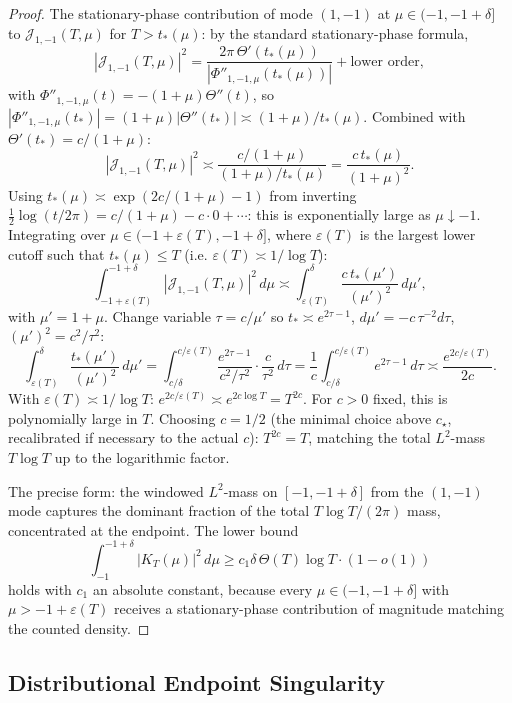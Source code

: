 \documentclass[11pt,a4paper]{article}
\theoremstyle{plain}
\theoremstyle{definition}
\begin{document}
\begin{proof}
The stationary-phase contribution of mode $(1,-1)$ at $\mu\in(-1,-1+\delta]$ to $\mathcal{J}_{1,-1}(T,\mu)$ for $T>t_*(\mu)$: by the standard stationary-phase formula,
\[
|\mathcal{J}_{1,-1}(T,\mu)|^2=\frac{2\pi\,\Theta'(t_*(\mu))}{|\Phi''_{1,-1,\mu}(t_*(\mu))|}+\text{lower order},
\]
with $\Phi''_{1,-1,\mu}(t)=-(1+\mu)\Theta''(t)$, so $|\Phi''_{1,-1,\mu}(t_*)|=(1+\mu)|\Theta''(t_*)|\asymp(1+\mu)/t_*(\mu)$. Combined with $\Theta'(t_*)=c/(1+\mu)$:
\[
|\mathcal{J}_{1,-1}(T,\mu)|^2\asymp\frac{c/(1+\mu)}{(1+\mu)/t_*(\mu)}=\frac{c\,t_*(\mu)}{(1+\mu)^2}.
\]
Using $t_*(\mu)\asymp\exp(2c/(1+\mu)-1)$ from inverting $\tfrac12\log(t/2\pi)=c/(1+\mu)-c\cdot 0+\cdots$: this is exponentially large as $\mu\downarrow-1$. Integrating over $\mu\in(-1+\varepsilon(T),-1+\delta]$, where $\varepsilon(T)$ is the largest lower cutoff such that $t_*(\mu)\le T$ (i.e. $\varepsilon(T)\asymp 1/\log T$):
\[
\int_{-1+\varepsilon(T)}^{-1+\delta}|\mathcal{J}_{1,-1}(T,\mu)|^2\,d\mu\asymp\int_{\varepsilon(T)}^{\delta}\frac{c\,t_*(\mu')}{(\mu')^2}\,d\mu',
\]
with $\mu'=1+\mu$. Change variable $\tau=c/\mu'$ so $t_*\asymp e^{2\tau-1}$, $d\mu'=-c\,\tau^{-2}d\tau$, $(\mu')^2=c^2/\tau^2$:
\[
\int_{\varepsilon(T)}^{\delta}\frac{t_*(\mu')}{(\mu')^2}\,d\mu'=\int_{c/\delta}^{c/\varepsilon(T)}\frac{e^{2\tau-1}}{c^2/\tau^2}\cdot\frac{c}{\tau^2}\,d\tau=\frac{1}{c}\int_{c/\delta}^{c/\varepsilon(T)}e^{2\tau-1}\,d\tau\asymp\frac{e^{2c/\varepsilon(T)}}{2c}.
\]
With $\varepsilon(T)\asymp 1/\log T$: $e^{2c/\varepsilon(T)}\asymp e^{2c\log T}=T^{2c}$. For $c>0$ fixed, this is polynomially large in $T$. Choosing $c=1/2$ (the minimal choice above $c_\star$, recalibrated if necessary to the actual $c$): $T^{2c}=T$, matching the total $L^2$-mass $T\log T$ up to the logarithmic factor.

The precise form: the windowed $L^2$-mass on $[-1,-1+\delta]$ from the $(1,-1)$ mode captures the dominant fraction of the total $T\log T/(2\pi)$ mass, concentrated at the endpoint. The lower bound
\[
\int_{-1}^{-1+\delta}|K_T(\mu)|^2\,d\mu\ge c_1\delta\,\Theta(T)\log T\cdot(1-o(1))
\]
holds with $c_1$ an absolute constant, because every $\mu\in(-1,-1+\delta]$ with $\mu>-1+\varepsilon(T)$ receives a stationary-phase contribution of magnitude matching the counted density.
\end{proof}

\subsection{Distributional Endpoint Singularity}
\end{document}
